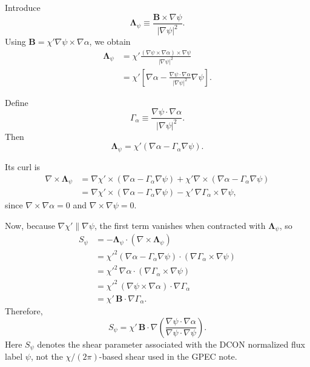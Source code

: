\documentclass[10pt,a4paper]{article}
\numberwithin{equation}{section}
\begin{document}
Introduce
\begin{equation}
\boldsymbol{\Lambda}_\psi
\equiv
\frac{\mathbf B\times\nabla\psi}{|\nabla\psi|^2}.
\end{equation}
Using $\mathbf B=\chi'\nabla\psi\times\nabla\alpha$, we obtain
\begin{align}
\boldsymbol{\Lambda}_\psi
&=
\chi'
\frac{(\nabla\psi\times\nabla\alpha)\times\nabla\psi}{|\nabla\psi|^2}
\\
&=
\chi'
\left[
\nabla\alpha
-
\frac{\nabla\psi\cdot\nabla\alpha}{|\nabla\psi|^2}\nabla\psi
\right].
\end{align}

Define
\begin{equation}
\Gamma_\alpha
\equiv
\frac{\nabla\psi\cdot\nabla\alpha}{|\nabla\psi|^2}.
\end{equation}
Then
\begin{equation}
\boldsymbol{\Lambda}_\psi
=
\chi'(\nabla\alpha-\Gamma_\alpha \nabla\psi).
\end{equation}

Its curl is
\begin{align}
\nabla\times\boldsymbol{\Lambda}_\psi
&=
\nabla\chi' \times (\nabla\alpha-\Gamma_\alpha\nabla\psi)
+
\chi'\nabla\times(\nabla\alpha-\Gamma_\alpha\nabla\psi)
\\
&=
\nabla\chi' \times (\nabla\alpha-\Gamma_\alpha\nabla\psi)
-
\chi'\,\nabla\Gamma_\alpha\times\nabla\psi,
\end{align}
since $\nabla\times\nabla\alpha=0$ and $\nabla\times\nabla\psi=0$.

Now, because $\nabla\chi' \parallel \nabla\psi$, the first term vanishes when contracted
with $\boldsymbol{\Lambda}_\psi$, so
\begin{align}
S_{\psi}
&=
-\boldsymbol{\Lambda}_\psi\cdot(\nabla\times\boldsymbol{\Lambda}_\psi)
\\
&=
\chi'^2
(\nabla\alpha-\Gamma_\alpha\nabla\psi)\cdot
(\nabla\Gamma_\alpha\times\nabla\psi)
\\
&=
\chi'^2\,\nabla\alpha\cdot(\nabla\Gamma_\alpha\times\nabla\psi)
\\
&=
\chi'^2\,(\nabla\psi\times\nabla\alpha)\cdot\nabla\Gamma_\alpha
\\
&=
\chi'\,\mathbf B\cdot\nabla\Gamma_\alpha.
\end{align}
Therefore,
\begin{equation}
\boxed{
S_{\psi}
=
\chi'\,\mathbf B\cdot\nabla
\left(
\frac{\nabla\psi\cdot\nabla\alpha}{\nabla\psi\cdot\nabla\psi}
\right).
}
\end{equation}
Here $S_{\psi}$ denotes the shear parameter associated with the DCON normalized flux
label $\psi$, not the $\chi/(2\pi)$-based shear used in the GPEC note.
\end{document}
